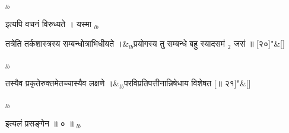 \documentclass[article,12pt,a4paper]{memoir}%
\newcounter{parCount}
\begin{document}
	  
	  
	  \endgroup
	{\tiny $_{lb}$}

	  
	  \pstart \leavevmode%
	इत्यपि वचनं विरुध्यते । यस्मा
	{}
	\pend%
      {\tiny $_{lb}$}
	  \bigskip
	  \begingroup
	
	    
	    \stanza[\smallbreak]
	  तत्रेति तर्कशास्त्रस्य सम्बन्धोत्राभिधीयते ।&{\tiny $_{lb}$}प्रयोगस्य तु सम्बन्धे बहु स्यादसमं {\tiny $_{2}$} जसं ॥ [२०]{\normalfontlatin\large\qquad{}"}\&[\smallbreak]
	  
	  
	  
	  \endgroup
	{\tiny $_{lb}$}
	  \bigskip
	  \begingroup
	
	    
	    \stanza[\smallbreak]
	  तस्यैव प्रकृतेरुक्तमेतच्चास्यैव लक्षणे ।&{\tiny $_{lb}$}परविप्रतिपत्तीनान्निषेधाय विशेषत [॥ २१]{\normalfontlatin\large\qquad{}"}\&[\smallbreak]
	  
	  
	  
	  \endgroup
	{\tiny $_{lb}$}

	  
	  \pstart \leavevmode%
	इत्यलं प्रसङ्गेन ॥ ० ॥
	{}
	\pend%
      {\tiny $_{lb}$}
\end{document}
